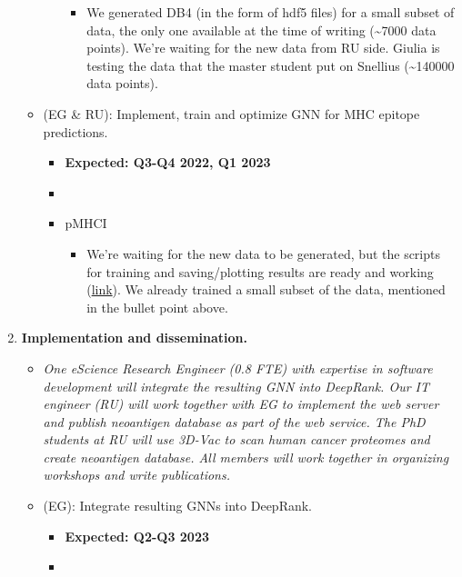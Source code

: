 \begin{enumerate}[start=0,leftmargin=.7in,label={\bfseries \ding{118} Task \arabic*:}]
\begin{itemize}
\begin{itemize}
\begin{itemize}
                \item We generated DB4 (in the form of hdf5 files) for a small subset of data, the only one available at the time of writing (\~{}7000 data points). We're waiting for the new data from RU side. Giulia is testing the data that the master student put on Snellius (\~{}140000 data points).
            \end{itemize}
        \end{itemize}
        \item (EG \& RU): Implement, train and optimize GNN for MHC epitope predictions.
        \begin{itemize}
            \item \textbf{Expected: Q3-Q4 2022, Q1 2023}
            \item {}
            \item pMHCI
            \begin{itemize}
                \item We're waiting for the new data to be generated, but the scripts for training and saving/plotting results are ready and working (\href{https://github.com/DeepRank/3D-Vac/tree/gcroci2_105_regenerate_hdf5_new_data/src/4_train_models/GNN/I/classification/struct}{link}). We already trained a small subset of the data, mentioned in the bullet point above.
            \end{itemize}
        \end{itemize}
    \end{itemize}
\item \textbf{Implementation and dissemination.}
    \begin{itemize}
        \item \textit{One eScience Research Engineer (0.8 FTE) with expertise in software development will integrate the resulting GNN into DeepRank. Our IT engineer (RU) will work together with EG to implement the web server and publish neoantigen database as part of the web service. The PhD students at RU will use 3D-Vac to scan human cancer proteomes and create neoantigen database. All members will work together in organizing workshops and write publications.}
        \item (EG): Integrate resulting GNNs into DeepRank.
        \begin{itemize}
            \item \textbf{Expected: Q2-Q3 2023}
            \item {}
        \end{itemize}

\end{itemize}
\end{enumerate}
